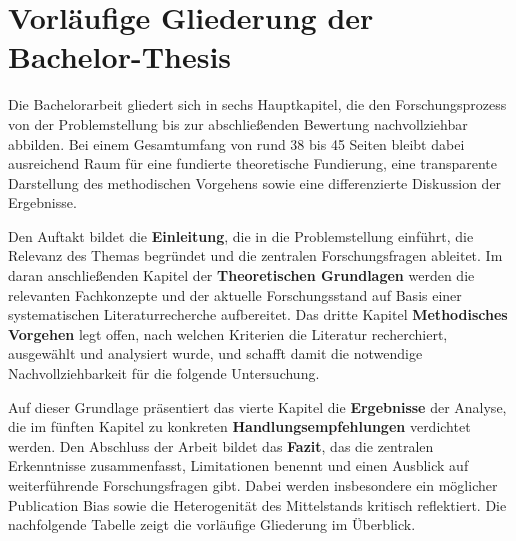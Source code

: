 \section{Vorläufige Gliederung der Bachelor-Thesis}

Die Bachelorarbeit gliedert sich in sechs Hauptkapitel, die den Forschungsprozess von der Problemstellung bis zur abschlie\ss{}enden Bewertung nachvollziehbar abbilden. Bei einem Gesamtumfang von rund 38 bis 45 Seiten bleibt dabei ausreichend Raum für eine fundierte theoretische Fundierung, eine transparente Darstellung des methodischen Vorgehens sowie eine differenzierte Diskussion der Ergebnisse.

Den Auftakt bildet die \textbf{Einleitung}, die in die Problemstellung einführt, die Relevanz des Themas begründet und die zentralen Forschungsfragen ableitet. Im daran anschlie\ss{}enden Kapitel der \textbf{Theoretischen Grundlagen} werden die relevanten Fachkonzepte und der aktuelle Forschungsstand auf Basis einer systematischen Literaturrecherche aufbereitet. Das dritte Kapitel \textbf{Methodisches Vorgehen} legt offen, nach welchen Kriterien die Literatur recherchiert, ausgewählt und analysiert wurde, und schafft damit die notwendige Nachvollziehbarkeit für die folgende Untersuchung.

Auf dieser Grundlage präsentiert das vierte Kapitel die \textbf{Ergebnisse} der Analyse, die im fünften Kapitel zu konkreten \textbf{Handlungsempfehlungen} verdichtet werden. Den Abschluss der Arbeit bildet das \textbf{Fazit}, das die zentralen Erkenntnisse zusammenfasst, Limitationen benennt und einen Ausblick auf weiterführende Forschungsfragen gibt. Dabei werden insbesondere ein möglicher Publication Bias sowie die Heterogenität des Mittelstands kritisch reflektiert. Die nachfolgende Tabelle zeigt die vorläufige Gliederung im Überblick.

